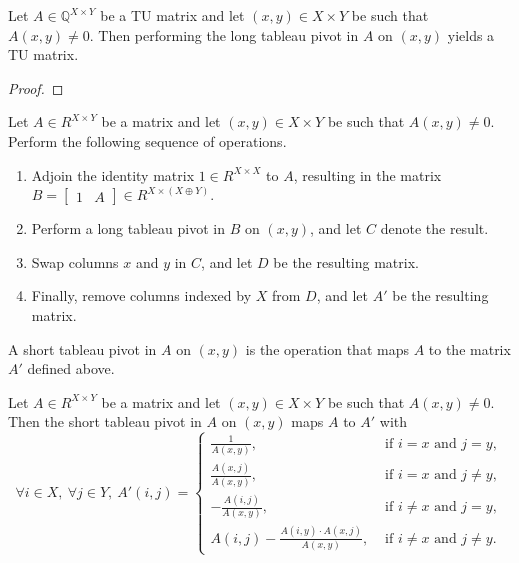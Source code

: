     \begin{lemma}
        \label{Matrix.IsTotallyUnimodular.longTableauPivot}
        \leanok
        Let $A \in \mathbb{Q}^{X \times Y}$ be a TU matrix and let $(x, y) \in X \times Y$ be such that $A (x, y) \neq 0$. Then performing the long tableau pivot in $A$ on $(x, y)$ yields a TU matrix.
\end{lemma}

\begin{proof}
    \leanok
    \SeeLean
\end{proof}



\begin{definition}
    \label{Matrix.shortTableauPivot}
    \leanok
    Let $A \in R^{X \times Y}$ be a matrix and let $(x, y) \in X \times Y$ be such that $A (x, y) \neq 0$. Perform the following sequence of operations.
    \begin{enumerate}
        \item Adjoin the identity matrix $1 \in R^{X \times X}$ to $A$, resulting in the matrix $B = \begin{bmatrix} 1 & A \end{bmatrix} \in R^{X \times (X \oplus Y)}$.
        \item Perform a long tableau pivot in $B$ on $(x, y)$, and let $C$ denote the result.
        \item Swap columns $x$ and $y$ in $C$, and let $D$ be the resulting matrix.
        \item Finally, remove columns indexed by $X$ from $D$, and let $A'$ be the resulting matrix.
    \end{enumerate}
    A short tableau pivot in $A$ on $(x, y)$ is the operation that maps $A$ to the matrix $A'$ defined above.
\end{definition}
\begin{lemma}
    \label{Matrix.shortTableauPivot_eq}
    \leanok
    Let $A \in R^{X \times Y}$ be a matrix and let $(x, y) \in X \times Y$ be such that $A (x, y) \neq 0$. Then the short tableau pivot in $A$ on $(x, y)$ maps $A$ to $A'$ with
    \[
        \forall i \in X, \ \forall j \in Y, \ A' (i, j) = \begin{cases}
            \frac{1}{A (x, y)}, & \text{ if } i = x \text{ and } j = y, \\
            \frac{A (x, j)}{A (x, y)}, & \text{ if } i = x \text{ and } j \neq y, \\
            -\frac{A (i, j)}{A (x, y)}, & \text{ if } i \neq x \text{ and } j = y, \\
            A (i, j) - \frac{A (i, y) \cdot A (x, j)}{A (x, y)}, & \text{ if } i \neq x \text{ and } j \neq y.
        \end{cases}
    \]
\end{lemma}

